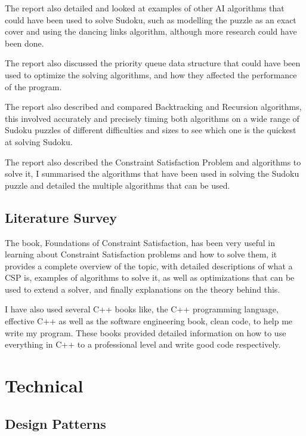 \documentclass[]{final_report}
\begin{document}
The report also detailed and looked at examples of other AI algorithms that could have been used to solve Sudoku, such as modelling the puzzle as an exact cover and using the dancing links algorithm, although more research could have been done.

The report also discussed the priority queue data structure that could have been used to optimize the solving algorithms, and how they affected the performance of the program.

The report also described and compared Backtracking and Recursion algorithms, this involved accurately and precisely timing both algorithms on a wide range of Sudoku puzzles of different difficulties and sizes to see which one is the quickest at solving Sudoku.

The report also described the Constraint Satisfaction Problem and algorithms to solve it, I summarised the algorithms that have been used in solving the Sudoku puzzle and detailed the multiple algorithms that can be used.

\section*{Literature Survey}

The book, Foundations of Constraint Satisfaction, has been very useful in learning about Constraint Satisfaction problems and how to solve them, it provides a complete overview of the topic, with detailed descriptions of what a CSP is, examples of algorithms to solve it, as well as optimizations that can be used to extend a solver, and finally explanations on the theory behind this.

I have also used several C++ books like, the C++ programming language, effective C++ as well as the software engineering book, clean code, to help me write my program. These books provided detailed information on how to use everything in C++ to a professional level and write good code respectively.

\chapter*{Technical}

\section*{Design Patterns}
\end{document}
